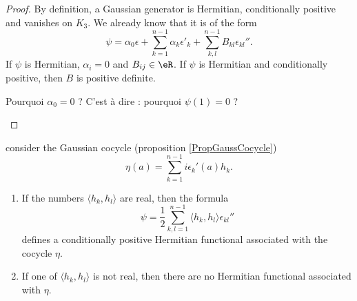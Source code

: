 \begin{proof}
    By definition, a Gaussian generator is Hermitian, conditionally positive and vanishes on $K_3$. We already know that it is of the form
    \begin{equation}        \label{EqFormgenpsiGauss}
        \psi=\alpha_0\epsilon+\sum_{k=1}^{n-1}\alpha_k\epsilon'_k+\sum_{k,l}^{n-1}B_{kl}\epsilon_{kl}''.
    \end{equation}
    If $\psi$ is Hermitian, $\alpha_i=0$ and $B_{ij}\in \eR$. If $\psi$ is Hermitian and conditionally positive, then $B$ is positive definite.

    \begin{probleme}
        Pourquoi $\alpha_0=0$ ? C'est à dire : pourquoi $\psi(1)=0$ ?
    \end{probleme}
    
\end{proof}

\begin{proposition}
    consider the Gaussian cocycle (proposition \ref{PropGaussCocycle})
    \begin{equation}
        \eta(a)=\sum_{k=1}^{n-1}i\epsilon_k'(a)h_k.
    \end{equation}
    \begin{enumerate}
        \item
            If the numbers $\langle h_k, h_l\rangle $ are real, then the formula
            \begin{equation}
                \psi=\frac{ 1 }{2}\sum_{k,l=1}^{n-1}\langle h_k, h_l\rangle \epsilon_{kl}''
            \end{equation}
            defines a conditionally positive Hermitian functional associated with the cocycle $\eta$.

        \item
            If one of $\langle h_k, h_l\rangle $ is not real, then there are no Hermitian functional associated with $\eta$.
    \end{enumerate}
    
\end{proposition}

